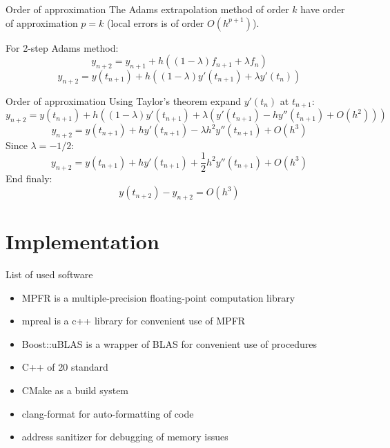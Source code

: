 \documentclass[10pt]{beamer}
\begin{document}
\begin{frame}{Order of approximation}
  The Adams extrapolation method of order $k$ have order of approximation $p = k$ (local errors is of order $O(h^{p+1})$).
  
  For 2-step Adams method:
  \begin{equation*}
    y_{n+2} = y_{n+1} + h((1-\lambda) f_{n+1} + \lambda f_n)
  \end{equation*}
  \begin{equation*}
    y_{n+2} = y(t_{n+1}) + h((1-\lambda)y'(t_{n+1})+\lambda y'(t_n))
  \end{equation*}
\end{frame}

\begin{frame}{Order of approximation}
  Using Taylor's theorem expand $y'(t_n)$ at $t_{n+1}$:
  \begin{equation*}
      y_{n+2} = y(t_{n+1}) + h((1-\lambda)y'(t_{n+1})+ \lambda (y'(t_{n+1}) - h y''(t_{n+1}) + O(h^2)))
  \end{equation*}
  \begin{equation*}
      y_{n+2} = y(t_{n+1}) + h y'(t_{n+1}) - \lambda h^2 y''(t_{n+1}) + O(h^3)
  \end{equation*}
  Since $\lambda = - 1/2$:
  \begin{equation*}
      y_{n+2} = y(t_{n+1}) + h y'(t_{n+1}) + \frac{1}{2} h^2 y''(t_{n+1}) + O(h^3)
  \end{equation*}
  End finaly:
  \begin{equation*}
    y(t_{n+2}) - y_{n+2} = O(h^3)
  \end{equation*}
\end{frame}

\section{Implementation}

\begin{frame}[fragile]{List of used software}
	\begin{itemize}
        \item MPFR is a multiple-precision floating-point computation library
		\item mpreal is a c++ library for convenient use of MPFR
		\item Boost::uBLAS is a wrapper of BLAS for convenient use of procedures
		\item C++ of 20 standard
		\item CMake as a build system
        \item clang-format for auto-formatting of code
        \item address sanitizer for debugging of memory issues
	\end{itemize}
\end{frame}
\end{document}
